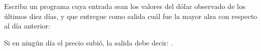 \documentclass[11pt,spanish,a5paper,landscape]{article}
\begin{document}
  \thispagestyle{empty}

  Escriba un programa cuya entrada sean
  los valores del dólar observado de los últimos diez días,
  y que entregue como salida cuál fue
  la mayor alza con respecto al día anterior:

  

  Si en ningún día el precio subió,
  la salida debe decir: .
\end{document}

